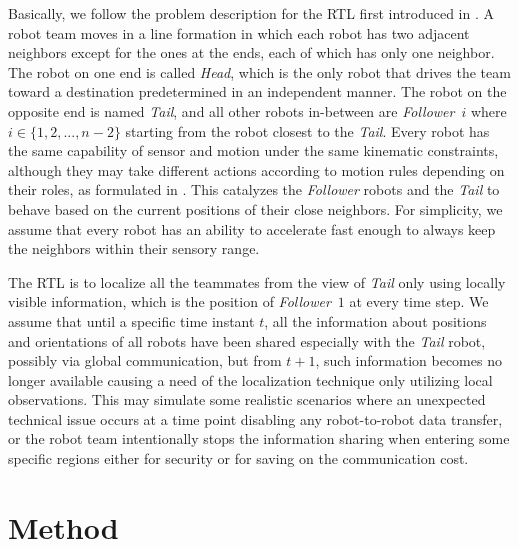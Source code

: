 \documentclass[letterpaper, 10 pt, conference]{ieeeconf}  %
\begin{document}
	Basically, we follow the problem description for the RTL
	first introduced in \cite{CPR17}. A robot team moves in a line formation 
	in which each robot has two adjacent neighbors except for the ones at the ends, 
	each of which has only one neighbor. 
	The robot on one end is called \emph{Head}, which is the only robot that 
	drives the team toward a destination predetermined in an independent manner.
	The robot on the opposite end is named \emph{Tail}, and all other robots 
	in-between are \emph{Follower}~$i$ where $i \in \{1, 2, ..., n-2\}$ starting
	from the robot closest to the \emph{Tail}.
	Every robot has the same capability of sensor and motion under the same 
	kinematic constraints, although they may take different actions according to 
	motion rules depending on their roles, as formulated in \cite{CPR17}. This catalyzes the
	 \emph{Follower} robots and the \emph{Tail} to behave based on the current positions of their close neighbors. For simplicity, we assume that every robot 
	 has an ability to accelerate fast enough to always keep the neighbors within their 
	 sensory range.
	
	The RTL is to localize all the teammates from the view of 
	\emph{Tail} only using locally visible information, which is the position of 
	\emph{Follower}~$1$ at every time step. We assume that until a specific time instant 
	$t$, all the information about positions and orientations of all robots 
	have been shared especially with the \emph{Tail} robot, 
	possibly via global communication,
	but from $t+1$, such information becomes no longer available causing a need of the
	localization technique only utilizing local observations.	
	This may simulate some realistic scenarios where 
	an unexpected technical issue occurs at a time point disabling any robot-to-robot
	data	transfer, or the robot team intentionally stops the information 
	sharing when entering some specific regions either for security or for saving on the
	 communication cost.
	 
	
	\section{Method}
	\label{sec:method}
	
\end{document}
